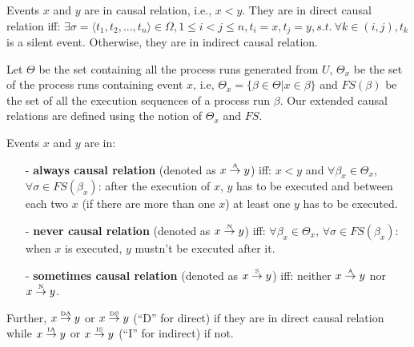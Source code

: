 \documentclass{llncs}
\begin{document}
\begin{definition}\label{def:sda}
Events $x$ and $y$ are in causal relation, i.e., $x<y$. They are in direct causal relation iff: $\exists\sigma=\langle t_{1},t_{2},...,t_{n}\rangle\in\Omega,1\leq i<j\leq n,t_{i}=x,t_{j}=y,s.t.~\forall k\in(i,j),t_{k}$ is a silent event. Otherwise, they are in indirect causal relation.
\end{definition}

Let $\Theta$ be the set containing all the process runs generated from $U$, $\Theta_{x}$ be the set of the process runs containing event $x$, i.e, $\Theta_{x}=\{\beta\in\Theta|x\in\beta\}$ and $FS(\beta)$ be the set of all the execution sequences of a process run $\beta$. Our extended causal relations are defined using the notion of $\Theta_{x}$ and $FS$.

\begin{definition}\label{def:extendedCausal}
Events $x$ and $y$ are in:
	\begin{itemize}
		\item[-] \textbf{always causal relation} (denoted as $x\overset{\text{\tiny{A}}}{\rightarrow}y$) iff: $x<y$ and $\forall\beta_{x}\in\Theta_{x}$, $\forall\sigma\in FS(\beta_{x})$: after the execution of $x$, $y$ has to be executed and between each two $x$ (if there are more than one $x$) at least one $y$ has to be executed.
		\item[-] \textbf{never causal relation} (denoted as $x\overset{\text{\tiny{N}}}{\rightarrow} y$) iff: $\forall\beta_{x}\in\Theta_{x}$, $\forall\sigma\in FS(\beta_{x})$: when $x$ is executed, $y$ mustn't be executed after it.
		\item[-] \textbf{sometimes causal relation} (denoted as $x\overset{\text{\tiny{S}}}{\rightarrow} y$) iff: neither $x\overset{\text{\tiny{A}}}{\rightarrow}y$ nor $x\overset{\text{\tiny{N}}}{\rightarrow} y$.
	\end{itemize}
	Further, $x\overset{\text{\tiny{DA}}}{\rightarrow}y$ or $x\overset{\text{\tiny{DS}}}{\rightarrow}y$ (``D'' for direct) if they are in direct causal relation while $x\overset{\text{\tiny{IA}}}{\rightarrow}y$ or $x\overset{\text{\tiny{IS}}}{\rightarrow}y$ (``I'' for indirect) if not.
\end{definition}
\end{document}
